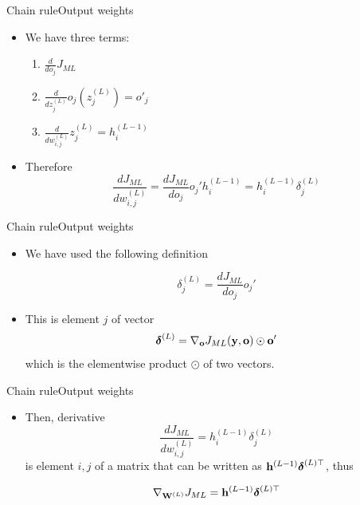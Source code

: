 \documentclass{beamer}
\begin{document}
\begin{frame}{Chain rule}{Output weights}
\begin{itemize}
    \item We have three terms:
    \vspace{0.5cm}
    \begin{enumerate}
        \item $\frac{d}{do_{j}}J_{ML}$ 
        \vspace{0.5cm}
        \item $\frac{d}{dz_{j}^{(L)}} o_j\left( z_j^{(L)}\right)=o'_j$
        \vspace{0.5cm}
        \item $\frac{d}{dw_{i,j}^{(L)}} z_j^{(L)} = h^{(L-1)}_i$
        \vspace{0.5cm}
    \end{enumerate}
    \item Therefore 
    \begin{equation}\label{eq:deivative_layer_L}
\frac{dJ_{ML}}{dw_{i,j}^{(L)}}= \frac{dJ_{ML}}{do_{j}}{o_j'} h_{i}^{(L-1)} = h_i^{(L-1)}\delta^{(L)}_j 
\end{equation}  
\end{itemize}
\end{frame}

\begin{frame}{Chain rule}{Output weights}

\begin{itemize}
    \item We have used the following definition

\begin{equation}\label{eq:error_term_layer_L}
    \delta^{(L)}_j = \frac{dJ_{ML}}{do_{j}}{o_j'} 
\end{equation}
    
    \item This is element $j$ of vector 
\begin{equation}
    {\boldsymbol \delta}^{(L)} = \nabla_{{\bf o}}J_{ML}({\bf y},{\bf o}) \odot {\bf o}'
\end{equation}
which is the elementwise product $\odot$ of two vectors. 
\end{itemize}
\end{frame}

\begin{frame}{Chain rule}{Output weights}

\begin{itemize}
\item Then, derivative 
\begin{equation}\nonumber
\frac{dJ_{ML}}{dw_{i,j}^{(L)}}= h_i^{(L-1)}\delta^{(L)}_j 
\end{equation}  
is element $i,j$ of a matrix that can be written as ${\bf h}^{(L-1)} {\boldsymbol \delta}^{(L)\top}$, thus

\begin{equation}\label{eq:output_gradient}
    \nabla_{{\bf W}^{(L)}} J_{ML} ={\bf h}^{(L-1)} {\boldsymbol \delta}^{(L)\top}
\end{equation} 

    
\end{itemize}
    
\end{frame}
\end{document}
